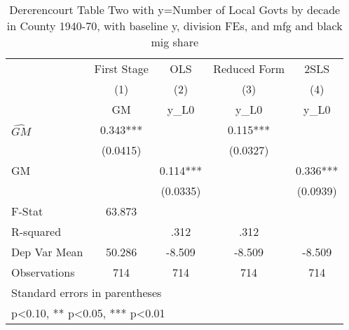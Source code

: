 \begin{table}[htbp]\centering
\def\sym#1{\ifmmode^{#1}\else\(^{#1}\)\fi}
\caption{Dererencourt Table Two with y=Number of Local Govts by decade in County 1940-70, with baseline y, division FEs, and mfg and black mig share}
\begin{tabular}{l*{4}{c}}
\toprule
                    & First Stage   &         OLS   &Reduced Form   &        2SLS   \\
                    &\multicolumn{1}{c}{(1)}&\multicolumn{1}{c}{(2)}&\multicolumn{1}{c}{(3)}&\multicolumn{1}{c}{(4)}\\
                    &\multicolumn{1}{c}{GM}&\multicolumn{1}{c}{y\_L0}&\multicolumn{1}{c}{y\_L0}&\multicolumn{1}{c}{y\_L0}\\
\midrule
$\hat{GM}$          &       0.343***&               &       0.115***&               \\
                    &    (0.0415)   &               &    (0.0327)   &               \\
\addlinespace
GM                  &               &       0.114***&               &       0.336***\\
                    &               &    (0.0335)   &               &    (0.0939)   \\
\midrule
F-Stat              &      63.873   &               &               &               \\
R-squared           &               &        .312   &        .312   &               \\
Dep Var Mean        &      50.286   &      -8.509   &      -8.509   &      -8.509   \\
Observations        &         714   &         714   &         714   &         714   \\
\bottomrule
\multicolumn{5}{l}{\footnotesize Standard errors in parentheses}\\
\multicolumn{5}{l}{\footnotesize * p<0.10, ** p<0.05, *** p<0.01}\\
\end{tabular}
\end{table}
